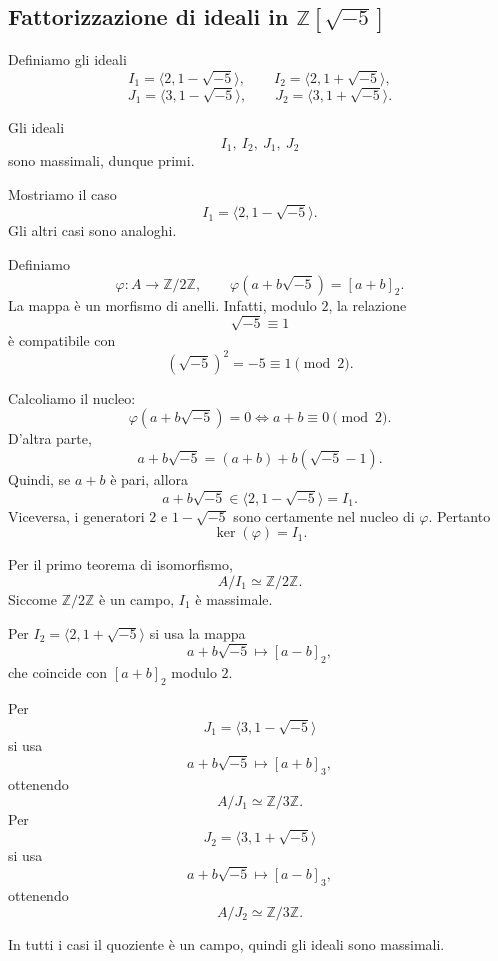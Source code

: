 \documentclass[a4paper]{article}
\begin{document}
\subsection{Fattorizzazione di ideali in \(\mathbb{Z}[\sqrt{-5}]\)}

\begin{radioactive}
Definiamo gli ideali
\[
    I_1=\langle 2,1-\sqrt{-5} \rangle,
    \qquad
    I_2=\langle 2,1+\sqrt{-5} \rangle,
\]
\[
    J_1=\langle 3,1-\sqrt{-5} \rangle,
    \qquad
    J_2=\langle 3,1+\sqrt{-5} \rangle.
\]
\end{radioactive}

\begin{radioactive}
\begin{snippetproposition}{}
    Gli ideali
    \[
        I_1,\ I_2,\ J_1,\ J_2
    \]
    sono massimali, dunque primi.
\end{snippetproposition}
\end{radioactive}

\begin{radioactive}
\begin{snippetproof}{}
    Mostriamo il caso
    \[
        I_1=\langle 2,1-\sqrt{-5} \rangle.
    \]
    Gli altri casi sono analoghi.

    Definiamo
    \[
        \varphi\colon A\to \mathbb{Z}/2\mathbb{Z},
        \qquad
        \varphi(a+b\sqrt{-5})=[a+b]_2.
    \]
    La mappa è un morfismo di anelli. Infatti, modulo \(2\), la relazione
    \[
        \sqrt{-5}\equiv 1
    \]
    è compatibile con
    \[
        (\sqrt{-5})^2=-5\equiv 1 \pmod 2.
    \]

    Calcoliamo il nucleo:
    \[
        \varphi(a+b\sqrt{-5})=0
        \iff
        a+b\equiv 0 \pmod 2.
    \]
    D'altra parte,
    \[
        a+b\sqrt{-5}
        =
        (a+b)+b(\sqrt{-5}-1).
    \]
    Quindi, se \(a+b\) è pari, allora
    \[
        a+b\sqrt{-5}\in \langle 2,1-\sqrt{-5} \rangle=I_1.
    \]
    Viceversa, i generatori \(2\) e \(1-\sqrt{-5}\) sono certamente nel nucleo di \(\varphi\).
    Pertanto
    \[
        \ker(\varphi)=I_1.
    \]

    Per il primo teorema di isomorfismo,
    \[
        A/I_1\simeq \mathbb{Z}/2\mathbb{Z}.
    \]
    Siccome \(\mathbb{Z}/2\mathbb{Z}\) è un campo, \(I_1\) è massimale.

    Per \(I_2=\langle 2,1+\sqrt{-5} \rangle\) si usa la mappa
    \[
        a+b\sqrt{-5}\mapsto [a-b]_2,
    \]
    che coincide con \([a+b]_2\) modulo \(2\).

    Per
    \[
        J_1=\langle 3,1-\sqrt{-5} \rangle
    \]
    si usa
    \[
        a+b\sqrt{-5}\mapsto [a+b]_3,
    \]
    ottenendo
    \[
        A/J_1\simeq \mathbb{Z}/3\mathbb{Z}.
    \]
    Per
    \[
        J_2=\langle 3,1+\sqrt{-5} \rangle
    \]
    si usa
    \[
        a+b\sqrt{-5}\mapsto [a-b]_3,
    \]
    ottenendo
    \[
        A/J_2\simeq \mathbb{Z}/3\mathbb{Z}.
    \]

    In tutti i casi il quoziente è un campo, quindi gli ideali sono massimali.
\end{snippetproof}
\end{radioactive}
\end{document}
